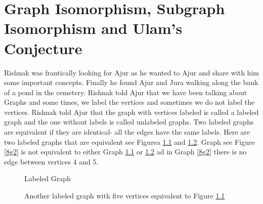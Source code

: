 \chapter{Graph Isomorphism, Subgraph Isomorphism and Ulam's Conjecture}

Rishnak was frantically looking for Ajur as he wanted to Ajur and share with him some important concepts. Finally he found Ajur and Jura walking along the bank of a pond in the cemetery. Rishnak told Ajur that we have been talking about Graphs and some times, we label the vertices and sometimes we do not label the vertices. Rishnak told Ajur that the graph with vertices labeled is called a labeled graph and the one without labels is called unlabeled graphs. Two labeled graphs are equivalent if they are identical- all the edges have the same labels. Here are two labeled graphs that are equivalent see Figurea \ref{8g1} and \ref{8g11}. Graph see Figure \ref{8g2} is not equivalent to either Graph \ref{8g1} or \ref{8g11} ad in Graph \ref{8g2} there is no edge between vertices 4 and 5.
\begin{figure}
\begin{center}
\caption{Labeled Graph}\label{8g1}
\end{center}

\end{figure}
\begin{figure}
\begin{center}
\caption{ Another labeled graph with five vertices equivalent to Figure \ref{8g1}}\label{8g11}
\end{center}
\end{figure}

